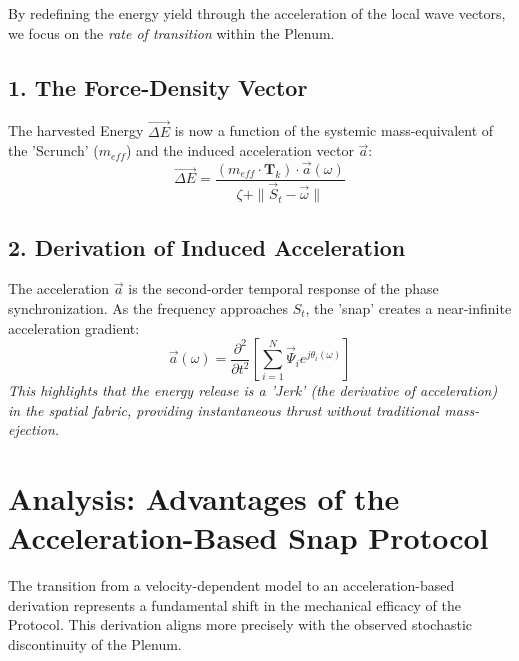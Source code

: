 \documentclass[11pt]{article}
\begin{document}
By redefining the energy yield through the acceleration of the local wave vectors, we focus on the \textit{rate of transition} within the Plenum. 

\subsection*{1. The Force-Density Vector}
The harvested Energy $\vec{\Delta E}$ is now a function of the systemic mass-equivalent of the 'Scrunch' ($m_{eff}$) and the induced acceleration vector $\vec{a}$:
\begin{equation}
    \vec{\Delta E} = \frac{(m_{eff} \cdot \mathbf{T}_k) \cdot \vec{a}(\omega)}{\zeta + \| \vec{S}_t - \vec{\omega} \|}
\end{equation}

\subsection*{2. Derivation of Induced Acceleration}
The acceleration $\vec{a}$ is the second-order temporal response of the phase synchronization. As the frequency approaches $S_t$, the 'snap' creates a near-infinite acceleration gradient:
\begin{equation}
    \vec{a}(\omega) = \frac{\partial^2}{\partial t^2} \left[ \sum_{i=1}^{N} \vec{\Psi}_i e^{j\theta_i(\omega)} \right]
\end{equation}
\textit{This highlights that the energy release is a 'Jerk' (the derivative of acceleration) in the spatial fabric, providing instantaneous thrust without traditional mass-ejection.}


\section*{Analysis: Advantages of the Acceleration-Based Snap Protocol}

The transition from a velocity-dependent model to an acceleration-based derivation represents a fundamental shift in the mechanical efficacy of the Protocol. This derivation aligns more precisely with the observed stochastic discontinuity of the Plenum.
\end{document}
